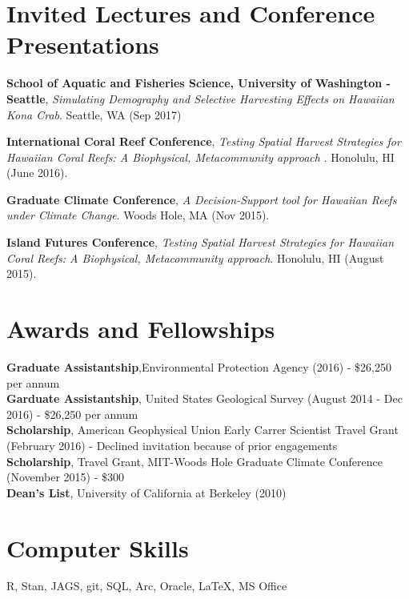 \documentclass[10pt, letterpaper]{article}
\begin{document}
\section*{Invited Lectures and Conference Presentations}

\noindent \textbf{School of Aquatic and Fisheries Science, University of Washington - Seattle}, \textit{Simulating Demography and Selective Harvesting Effects on Hawaiian Kona Crab}. Seattle, WA (Sep 2017)

\noindent \textbf{International Coral Reef Conference}, \textit{Testing Spatial Harvest Strategies for Hawaiian Coral Reefs: A Biophysical, Metacommunity approach }. Honolulu, HI (June 2016).

\noindent \textbf{Graduate Climate Conference}, \textit{A Decision-Support tool for Hawaiian Reefs under Climate Change}. Woods Hole, MA (Nov 2015).

\noindent \textbf{Island Futures Conference}, \textit{Testing Spatial Harvest Strategies for Hawaiian Coral Reefs: A Biophysical, Metacommunity approach}. Honolulu, HI (August 2015).

\section*{Awards and Fellowships}
\textbf{Graduate Assistantship},Environmental Protection Agency (2016) - \$26,250 per annum \\
\textbf{Garduate Assistantship}, United States Geological Survey (August 2014 - Dec 2016) - \$26,250 per annum \\
\textbf{Scholarship}, American Geophysical Union Early Carrer Scientist Travel Grant (February 2016) - Declined invitation because of prior engagements \\
\textbf{Scholarship}, Travel Grant, MIT-Woods Hole Graduate Climate Conference (November 2015) - \$300 \\
\textbf{Dean's List}, University of California at Berkeley (2010) \\

\section*{Computer Skills}
 R, Stan, JAGS, git, SQL, Arc, Oracle, \LaTeX, MS Office
\end{document}
